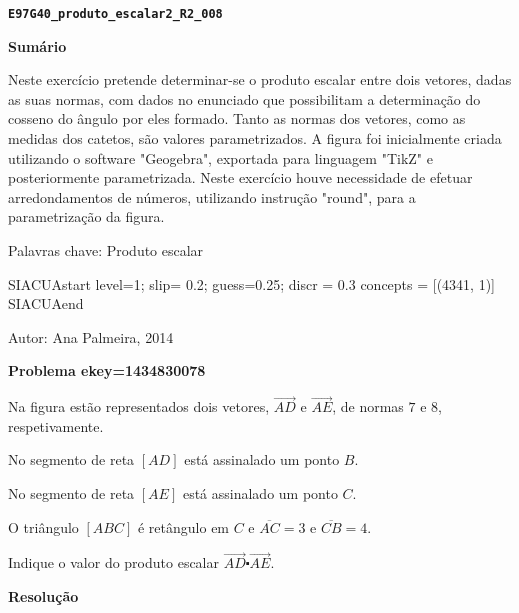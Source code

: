 \documentclass{article}
\begin{document}
{\centering\bf \verb"E97G40_produto_escalar2_R2_008" }

\noindent\textbf{Sumário}


Neste exercício pretende determinar-se o produto escalar entre dois vetores, dadas as suas normas, com dados no enunciado que possibilitam a determinação do cosseno do ângulo por eles formado. Tanto as normas dos vetores, como as medidas dos catetos, são valores parametrizados. 
A figura foi inicialmente criada utilizando o software "Geogebra", exportada para linguagem "TikZ" e posteriormente parametrizada.
Neste exercício houve necessidade de efetuar arredondamentos de números, utilizando instrução "round", para a parametrização da figura.



Palavras chave: Produto escalar


SIACUAstart
level=1;  slip= 0.2; guess=0.25; discr = 0.3 
concepts = [(4341, 1)]
SIACUAend

Autor: Ana Palmeira, 2014




\noindent\textbf{Problema ekey=1434830078 }



Na figura estão representados dois vetores, $\overrightarrow{AD}$ e $\overrightarrow{AE}$, de normas $7$ e $8$, respetivamente.


No segmento de reta $[AD]$ está assinalado um ponto $B$.

No segmento de reta $[AE]$ está assinalado um ponto $C$.

O triângulo $[ABC]$ é retângulo em $C$ e $\overline{AC}=3$ e $\overline{CB}=4$.


Indique o valor do produto escalar $\overrightarrow{AD} \centerdot \overrightarrow{AE}$.

    

 

\noindent\textbf{Resolução}
\end{document}
